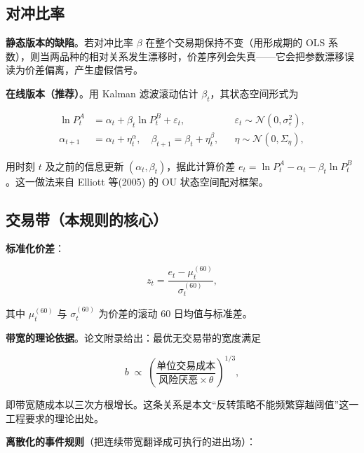 \subsection{对冲比率}

\textbf{静态版本的缺陷}。若对冲比率 $\beta$ 在整个交易期保持不变（用形成期的 OLS 系数），则当两品种的相对关系发生漂移时，价差序列会失真——它会把参数漂移误读为价差偏离，产生虚假信号。

\textbf{在线版本（推荐）}。用 Kalman 滤波滚动估计 $\beta_t$，其状态空间形式为

\begin{equation}
\begin{aligned}
\ln P^A_t &= \alpha_t+\beta_t\ln P^B_t+\varepsilon_t, &&\varepsilon_t\sim\mathcal N(0,\sigma_\varepsilon^2),\\
\alpha_{t+1}&=\alpha_t+\eta^{\alpha}_t, \quad
\beta_{t+1}=\beta_t+\eta^{\beta}_t, &&\eta\sim\mathcal N(0,\Sigma_\eta),
\end{aligned}
\end{equation}

用时刻 $t$ 及之前的信息更新 $(\alpha_t,\beta_t)$，据此计算价差 $e_t=\ln P^A_t-\alpha_t-\beta_t\ln P^B_t$。这一做法来自 Elliott 等(2005) 的 OU 状态空间配对框架\cite{elliott2005}。

\subsection{交易带（本规则的核心）}

\textbf{标准化价差}：

\begin{equation}
z_t=\frac{e_t-\mu_t^{(60)}}{\sigma_t^{(60)}} ,
\end{equation}

其中 $\mu_t^{(60)}$ 与 $\sigma_t^{(60)}$ 为价差的滚动 60 日均值与标准差。

\textbf{带宽的理论依据}。论文附录给出：最优无交易带的宽度满足

\begin{equation}
b\;\propto\;\left(\frac{\text{单位交易成本}}{\text{风险厌恶}\times\theta}\right)^{1/3},
\end{equation}

即带宽随成本以三次方根增长\cite{martin2011}。这条关系是本文“反转策略不能频繁穿越阈值”这一工程要求的理论出处。

\textbf{离散化的事件规则}（把连续带宽翻译成可执行的进出场）：

